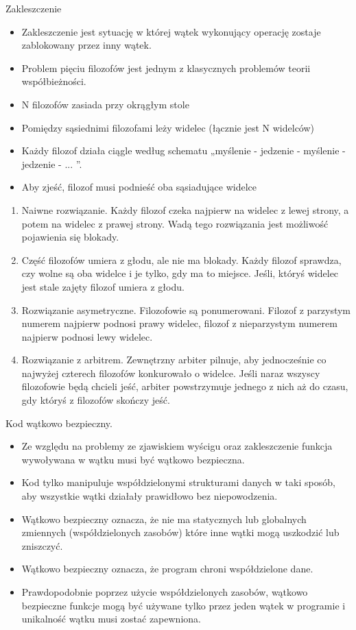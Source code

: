 \documentclass[notheorems, aspectratio=54]{beamer}
\begin{document}
\begin{frame}
Zakleszczenie
\begin{itemize}
\item Zakleszczenie jest sytuację w której wątek wykonujący operację zostaje zablokowany przez inny wątek.
\item Problem pięciu filozofów jest jednym z klasycznych problemów teorii współbieżności.
\item N filozofów zasiada przy okrągłym stole
\item Pomiędzy sąsiednimi filozofami leży widelec (łącznie jest N widelców)
\item Każdy filozof działa ciągle według schematu „myślenie - jedzenie - myślenie - jedzenie - ... ”.
\item Aby zjeść, filozof musi podnieść oba sąsiadujące widelce
\end{itemize}

\begin{enumerate}
\item Naiwne rozwiązanie. Każdy filozof czeka najpierw na widelec z lewej strony, a potem na widelec 
      z prawej strony. Wadą tego rozwiązania jest możliwość pojawienia się blokady.
\item Część filozofów umiera z głodu, ale nie ma blokady. Każdy filozof sprawdza, czy 
      wolne są oba widelce i je tylko, gdy ma to miejsce. Jeśli, któryś widelec jest stale 
      zajęty filozof umiera z głodu.
\item Rozwiązanie asymetryczne. Filozofowie są ponumerowani. Filozof z parzystym numerem
      najpierw podnosi prawy widelec, filozof z nieparzystym numerem najpierw podnosi lewy
      widelec.
\item Rozwiązanie z arbitrem. Zewnętrzny arbiter pilnuje, aby jednocześnie co
      najwyżej czterech filozofów konkurowało o widelce. Jeśli naraz
      wszyscy filozofowie będą chcieli jeść, arbiter powstrzymuje jednego z nich aż do czasu, gdy
      któryś z filozofów skończy jeść.
\end{enumerate}

\end{frame}

\begin{frame}
Kod wątkowo bezpieczny.
\begin{itemize}
\item Ze względu na problemy ze zjawiskiem wyścigu oraz zakleszczenie funkcja wywoływana w wątku musi być wątkowo bezpieczna.
\item Kod tylko manipuluje współdzielonymi strukturami danych w taki sposób, aby wszystkie wątki działały prawidłowo bez niepowodzenia.
\item Wątkowo bezpieczny oznacza, że nie ma statycznych lub globalnych zmiennych (współdzielonych zasobów) które inne wątki mogą uszkodzić lub zniszczyć.
\item Wątkowo bezpieczny oznacza, że program chroni współdzielone dane.
\item Prawdopodobnie poprzez użycie współdzielonych zasobów, wątkowo bezpieczne funkcje mogą być używane tylko przez jeden wątek w programie i unikalność wątku musi zostać zapewniona.
\end{itemize}
\end{frame}
\end{document}
